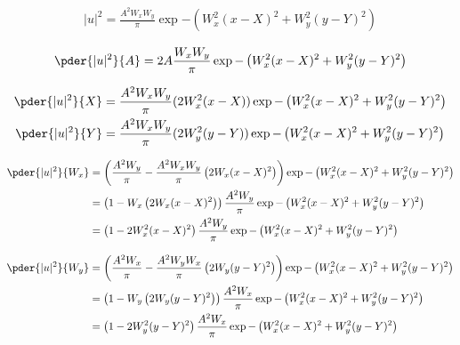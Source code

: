\begin{equation}
\begin{split}
|u|^2 = \frac{A^2W_x W_y}{\pi} \exp{-\left( W_x^2(x-X)^2 + W_y^2(y-Y)^2 \right)}
\end{split}
\end{equation}

\begin{equation}
\begin{split}
\pder{|u|^2}{A}  = 2A \frac{W_x W_y}{\pi} \exp{-\left( W_x^2(x-X)^2 + W_y^2(y-Y)^2 \right)}
\end{split}
\end{equation}

\begin{equation}
\begin{split}
\pder{|u|^2}{X}  &= \frac{A^2W_x W_y}{\pi} (2W_x^2(x-X)) \exp{-\left( W_x^2(x-X)^2 + W_y^2(y-Y)^2 
\right)}\\
\pder{|u|^2}{Y}  &= \frac{A^2W_x W_y}{\pi} (2W_y^2(y-Y)) \exp{-\left( W_x^2(x-X)^2 + W_y^2(y-Y)^2 \right)}
\end{split}
\end{equation}





\begin{equation}
\begin{split}
\pder{|u|^2}{W_{x}} &= \left( \frac{A^2 W_y}{\pi} - \frac{A^2 W_{x} W_y}{\pi} \left(2W_x(x-X)^2\right)  \right)\exp{-\left( W_x^2(x-X)^2 + W_y^2(y-Y)^2 \right)}\\
&= \left( 1 - W_{x} \left(2W_x(x-X)^2\right)  \right) \frac{A^2 W_y}{\pi} \exp{-\left( W_x^2(x-X)^2 + W_y^2(y-Y)^2 \right)}\\
&= \left(1  - 2 W_{x}^2 (x-X)^2  \right) \frac{A^2 W_y}{\pi}\exp{-\left( W_x^2(x-X)^2 + W_y^2(y-Y)^2 \right)}\\
\end{split}
\end{equation}


\begin{equation}
\begin{split}
\pder{|u|^2}{W_{y}} &= \left( \frac{A^2 W_x}{\pi} - \frac{A^2 W_{y} W_x}{\pi} \left(2W_y(y-Y)^2\right) \right)\exp{-\left( W_x^2(x-X)^2 + W_y^2(y-Y)^2 \right)}\\
&= \left( 1 - W_{y} \left(2W_y(y-Y)^2\right)  \right) \frac{A^2 W_x}{\pi} \exp{-\left( W_x^2(x-X)^2 + W_y^2(y-Y)^2 \right)}\\
&= \left(1  - 2 W_{y}^2 (y-Y)^2  \right) \frac{A^2 W_x}{\pi}\exp{-\left( W_x^2(x-X)^2 + W_y^2(y-Y)^2 \right)}\\
\end{split}
\end{equation}

